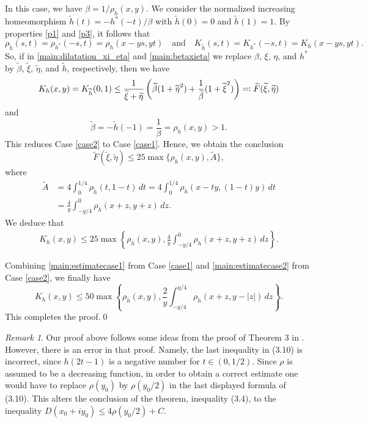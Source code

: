 \documentclass{amsart}
\theoremstyle{plain}
\theoremstyle{definition}
\theoremstyle{remark}
\newtheorem{remark}[theorem]{Remark}
\numberwithin{equation}{section}
\numberwithin{theorem}{section}
\numberwithin{conjecture}{section}
\newcommand{\1}{\mathbf 1}
\begin{document}
\noindent
In this case, we have $\beta=1/\rho_h(x,y)$. We consider the normalized increasing homeomorphism  ${\widetilde h} (t)=-h^*(-t)/\beta$ with $\widetilde h(0)=0$ and $\widetilde h(1)=1$. By properties \ref{p1} and \ref{p3}, it follows that
\[\rho_{\widetilde h} (s,t)= \rho_{h^*}(-s,t)=\rho_{h}(x-ys,yt)\quad \textrm{and}\quad K_{\widetilde{h}}(s,t)=K_{h^*}(-s,t)=K_{h}(x-ys,yt).\]
So, if in \eqref{main:dilatation_xi_eta} and \eqref{main:betaxieta} we replace  $\beta$, $\xi$, $\eta$, and $h^*$ by $\widetilde \beta$, $\widetilde \xi$, $\widetilde \eta$, and $\widetilde{h}$, respectively, then we have 
\begin{align*}
K_h(x,y)= K_{\widetilde h}(0,1)  \leq \frac{1}{\widetilde \xi+\widetilde \eta}\left(\widetilde \beta(1+\widetilde{\eta\mkern 0mu}^{2})+\frac{1}{\widetilde \beta}(1+\widetilde{\xi\mkern 0mu}^{2})\right) \eqqcolon \widetilde F(\widetilde \xi, \widetilde \eta)
\end{align*}
and 
$$\widetilde \beta=-\widetilde{h} (-1)=\frac{1}{\beta}=\rho_h(x,y)>1.$$
This reduces Case \ref{case2} to Case \ref{case1}. Hence, we obtain the conclusion
$$\widetilde F(\widetilde \xi, \widetilde \eta) \leq 25 \max\{\rho_h(x,y), \widetilde A\},$$
where
\begin{align}
\widetilde{A}&=4\int_0^{1/4} \rho_{\widetilde{h}}(t,1-t)\,dt=4\int_0^{1/4} \rho_{h}(x-ty,(1-t)y)\,dt \nonumber\\
&=\frac{4}{y}\int_{-y/4}^0 \rho_{h}(x+z,y+z)\,dz \nonumber.
\end{align}
We deduce that
\begin{align}\label{main:estimatecase2}
K_h(x,y)\le 25 \max \left\{ \rho_h (x,y), \frac{4}{y}\int_{-y/4}^0 \rho_{h}(x+z,y+z)\,dz \right\}. 
\end{align}

\bigskip

Combining \eqref{main:estimatecase1} from Case \ref{case1} and \eqref{main:estimatecase2} from Case \ref{case2}, we finally have
\[K_h(x,y)\le 50 \max \left\{ \rho_h (x,y), \frac{2}{y}\int_{-y/4}^{y/4} \rho_{h}(x+z,y-|z|)\,dz \right\}.\]
This completes the proof.\qed

\begin{remark}\label{remark:error}
Our proof above follows some ideas from the proof of Theorem 3 in \cite{ChenChenHe:boundary}. However, there is an error in that proof. Namely, the last inequality in (3.10) is incorrect, since $h(2t-1)$ is a negative number for $t\in (0,1/2)$. Since $\rho$ is assumed to be a decreasing function, in order to obtain a correct estimate one would have to replace $\rho(y_0)$ by $\rho(y_0/2)$ in the last displayed formula of (3.10). This alters the conclusion of the theorem, inequality (3.4), to the inequality
$D(x_0+iy_0)\leq 4\rho(y_0/2)+C.$
\end{remark}
\end{document}

